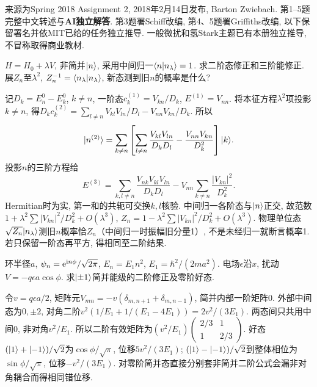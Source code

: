 来源为Spring 2018 Assignment 2, 2018年2月14日发布, Barton Zwiebach. 第1--5题完整中文转述与\textbf{AI独立解答}. 第3题署Schiff改编, 第4、5题署Griffiths改编, 以下保留署名并依MIT已给的任务独立推导. 一般微扰和氢Stark主题已有本册独立推导, 不冒称取得商业教材.
\begin{exercise}
$H=H_0+\lambda V$, 非简并$\lvert n\rangle$, 采用中间归一$\langle n\vert n_\lambda\rangle=1$. 求二阶态修正和三阶能修正. 展$Z_n$至$\lambda^2$, $Z_n^{-1}=\langle n_\lambda\vert n_\lambda\rangle$, 新态测到旧$n$的概率是什么?
\end{exercise}
\begin{solution}
记$D_k=E_n^0-E_k^0$, $k\ne n$, 一阶态$c_k^{(1)}=V_{kn}/D_k$, $E^{(1)}=V_{nn}$. 将本征方程$\lambda^2$项投影$k\ne n$, 得$D_kc_k^{(2)}=\sum_{l\ne n}V_{kl}V_{ln}/D_l-V_{nn}V_{kn}/D_k$. 所以
\[
\lvert n^{(2)}\rangle=\sum_{k\ne n}\left[\sum_{l\ne n}\frac{V_{kl}V_{ln}}{D_kD_l}-\frac{V_{nn}V_{kn}}{D_k^2}\right]\lvert k\rangle.
\]
投影$n$的三阶方程给
\[
E^{(3)}=\sum_{k,l\ne n}\frac{V_{nk}V_{kl}V_{ln}}{D_kD_l}
-V_{nn}\sum_{k\ne n}\frac{|V_{kn}|^2}{D_k^2}.
\]
Hermitian时为实, 第一和的共轭可交换$k,l$核验. 中间归一各阶态与$\lvert n\rangle$正交, 故范数$1+\lambda^2\sum|V_{kn}|^2/D_k^2+O(\lambda^3)$, $Z_n=1-\lambda^2\sum|V_{kn}|^2/D_k^2+O(\lambda^3)$. 物理单位态$\sqrt{Z_n}\lvert n_\lambda\rangle$测旧$n$概率恰$Z_n$（中间归一时振幅旧分量1）, 不是未经归一就断言概率1. 若只保留一阶态再平方, 得相同至二阶结果.
\end{solution}
\begin{exercise}
环半径$a$, $\psi_n=\mathrm e^{\mathrm i n\phi}/\sqrt{2\pi}$, $E_n=E_1n^2$, $E_1=\hbar^2/(2ma^2)$. 电场$\epsilon$沿$x$, 扰动$V=-q\epsilon a\cos\phi$. 求$\lvert \pm1\rangle$简并能级的二阶修正及零阶好态.
\end{exercise}
\begin{solution}
令$v=q\epsilon a/2$, 矩阵元$V_{mn}=-v(\delta_{m,n+1}+\delta_{m,n-1})$, 简并内部一阶矩阵0. 外部中间态为$0,\pm2$, 对角二阶$v^2(1/E_1+1/(E_1-4E_1))=2v^2/(3E_1)$. 两态间只共用中间$0$, 非对角$v^2/E_1$. 所以二阶有效矩阵为$(v^2/E_1)\begin{pmatrix}2/3&1\\1&2/3\end{pmatrix}$. 好态$(\lvert 1\rangle+\lvert -1\rangle)/\sqrt2$为$\cos\phi/\sqrt\pi$, 位移$5v^2/(3E_1)$; $(\lvert 1\rangle-\lvert -1\rangle)/\sqrt2$到整体相位为$\sin\phi/\sqrt\pi$, 位移$-v^2/(3E_1)$. 对零阶简并态直接分别套非简并二阶公式会漏非对角耦合而得相同错位移.
\end{solution}


